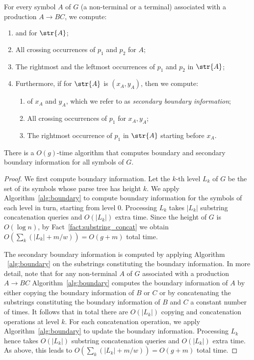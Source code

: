 For every symbol $A$ of $G$ (a non-terminal or a terminal) associated with a production $A\rightarrow BC$, we compute:
\begin{enumerate}
    \item {} and  for $\str{A}$;
    \item All crossing occurrences of $p_1$ and $p_2$ for $A$;
    \item The rightmost and the leftmost occurrences of $p_1$ and $p_2$ in $\str{A}$;
    \item Furthermore, if  for $\str{A}$ is $(x_A,y_A)$, then we compute:
    \begin{enumerate}
    	\item {} of $x_A$ and $y_A$, which we refer to as \emph{secondary boundary information};
    	\item All crossing occurrences of $p_1$ for $x_A, y_A$;
    	\item The rightmost occurrence of $p_1$ in $\str{A}$ starting before $x_A$.
   	\end{enumerate}
\end{enumerate}

\begin{proposition}
There is a $O(g)$-time algorithm that computes boundary and secondary boundary information for all symbols of $G$.
\end{proposition}
\begin{proof}
We first compute boundary information. Let the $k$-th level $L_k$ of $G$ be the set of its symbols whose parse tree has height $k$. We apply Algorithm~\ref{alg:boundary} to compute boundary information for the symbols of each level in turn, starting from level $0$. Processing $L_k$ takes $|L_k|$ substring concatenation queries and $O(|L_k|)$ extra time. Since the height of $G$ is $O(\log n)$, by Fact~\ref{fact:substring_concat} we obtain $O(\sum_{k} (|L_k| + m/w)) = O(g+m)$ total time. 

The secondary boundary information is computed by applying Algorithm ~\ref{alg:boundary} on the substrings constituting the boundary information. In more detail, note that for any non-terminal $A$ of $G$ associated with a production $A \rightarrow BC$ Algorithm~\ref{alg:boundary} computes the boundary information of $A$ by either copying the boundary information of $B$ or $C$ or by concatenating the substrings constituting the boundary information of $B$ and $C$ a constant number of times. It follows that in total there are $O(|L_k|)$ copying and concatenation operations at level $k$. For each concatenation operation, we apply Algorithm~\ref{alg:boundary} to update the boundary information. 
Processing $L_k$ hence takes $O(|L_k|)$ substring concatenation queries and $O(|L_k|)$ extra time. As above, this leads to  $O(\sum_{k} (|L_k| + m/w)) = O(g+m)$ total time. 

\end{proof}

